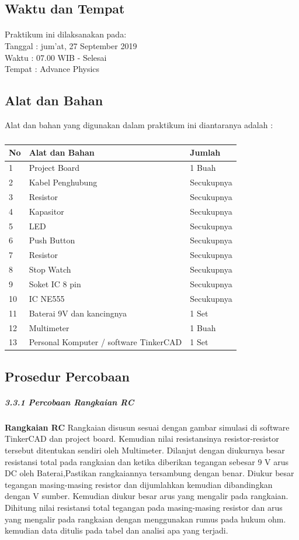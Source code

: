 \documentclass[12pt,a4paper]{article}
\begin{document}
\subsection{Waktu dan Tempat}
\paragraph{ }
Praktikum ini dilaksanakan pada:
\\ 		Tanggal : jum'at, 27 September 2019
\\ 		Waktu : 07.00 WIB - Selesai
\\ 		Tempat : Advance Physics 

\subsection{Alat dan Bahan}
Alat dan bahan yang digunakan dalam praktikum ini diantaranya adalah : 
\subparagraph*{ }
\begin{tabular}{|l|l|l|}  \hline
No & Alat dan Bahan  & Jumlah  \\ \hline
1  & Project Board & 1 Buah \\ \hline
2  & Kabel Penghubung & Secukupnya \\ \hline
3  & Resistor & Secukupnya \\ \hline
4  & Kapasitor & Secukupnya \\ \hline
5  & LED & Secukupnya \\ \hline
6  & Push Button & Secukupnya \\ \hline
7  & Resistor & Secukupnya \\ \hline
8  & Stop Watch & Secukupnya \\ \hline
9  & Soket IC 8 pin & Secukupnya \\ \hline
10  & IC NE555 & Secukupnya \\ \hline
11 & Baterai 9V dan kancingnya & 1 Set \\ \hline
12 & Multimeter & 1 Buah \\ \hline
13 & Personal Komputer / software TinkerCAD & 1 Set \\ \hline

\end{tabular}

  
    
\subsection{Prosedur Percobaan}
	\subparagraph{3.3.1 Percobaan Rangkaian RC}
	\subparagraph{ }
\textbf{Rangkaian RC} Rangkaian disusun sesuai dengan gambar simulasi di software TinkerCAD dan project board. Kemudian nilai resistansinya resistor-resistor tersebut ditentukan sendiri oleh Multimeter. Dilanjut dengan diukurnya besar resistansi total pada rangkaian dan ketika diberikan tegangan sebesar 9 V arus DC oleh Baterai,Pastikan rangkaiannya tersambung dengan benar. Diukur besar tegangan masing-masing resistor dan dijumlahkan kemudian dibandingkan dengan V sumber. Kemudian diukur besar arus yang mengalir pada rangkaian. Dihitung nilai resistansi total tegangan pada masing-masing resistor dan arus yang mengalir pada rangkaian dengan menggunakan rumus pada hukum ohm. kemudian data ditulis pada tabel dan analisi apa yang terjadi.
\end{document}
